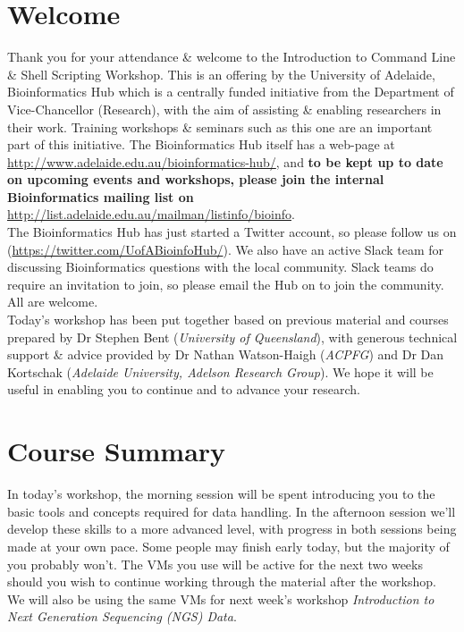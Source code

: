 %
%
\newpage
\section{Welcome}
Thank you for your attendance \& welcome to the Introduction to Command Line \& Shell Scripting Workshop.
This is an offering by the University of Adelaide, Bioinformatics Hub which is a centrally funded initiative from the Department of Vice-Chancellor (Research), with the aim of assisting \& enabling researchers in their work.
Training workshops \& seminars such as this one  are an important part of this initiative. 
The Bioinformatics Hub itself has a web-page at \url{http://www.adelaide.edu.au/bioinformatics-hub/}, and \textbf{to be kept up to date on upcoming events and workshops, please join the internal Bioinformatics mailing list on} \url{http://list.adelaide.edu.au/mailman/listinfo/bioinfo}.\\

The Bioinformatics Hub has just started a Twitter account, so please follow us on (\url{https://twitter.com/UofABioinfoHub/}).
We also have an active Slack team for discussing Bioinformatics questions with the local community.
Slack teams do require an invitation to join, so please email the Hub on  to join the community.
All are welcome.\\

Today's workshop has been put together based on previous material and courses prepared by Dr Stephen Bent (\textit{University of Queensland}), with generous technical support \& advice provided by Dr Nathan Watson-Haigh (\textit{ACPFG}) and Dr Dan Kortschak (\textit{Adelaide University, Adelson Research Group}). 
We hope it will be useful in enabling you to continue and to advance your research.\\

\section{Course Summary}
In today's workshop, the morning session will be spent introducing you to the basic tools and concepts required for data handling.
In the afternoon session we'll develop these skills to a more advanced level, with progress in both sessions being made at your own pace.
Some people may finish early today, but the majority of you probably won't.
The VMs you use will be active for the next two weeks should you wish to continue working through the material after the workshop.
We will also be using the same VMs for next week's workshop \textit{Introduction to Next Generation Sequencing (NGS) Data}.\\


